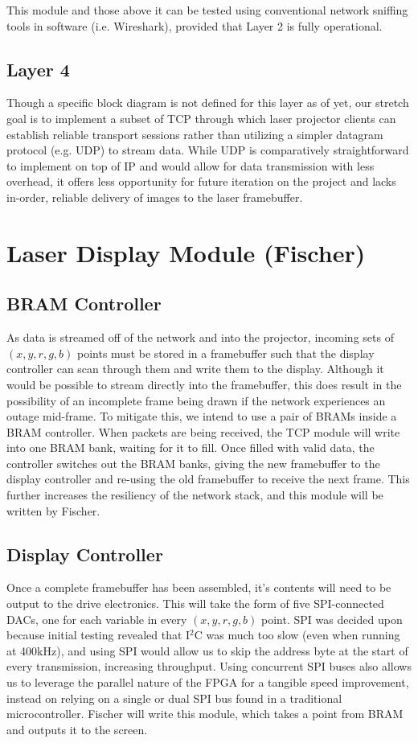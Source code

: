 \documentclass[11pt]{article}
\begin{document}
\noindent This module and those above it can be tested using conventional network sniffing tools in software (i.e. Wireshark), provided that Layer 2 is fully operational.

\subsection{Layer 4}
Though a specific block diagram is not defined for this layer as of yet, our stretch goal is to implement a subset of TCP through which laser projector clients can establish reliable transport sessions rather than utilizing a simpler datagram protocol (e.g. UDP) to stream data. While UDP is comparatively straightforward to implement on top of IP and would allow for data transmission with less overhead, it offers less opportunity for future iteration on the project and lacks in-order, reliable delivery of images to the laser framebuffer.

\section{Laser Display Module (Fischer)}
\subsection{BRAM Controller}
\noindent As data is streamed off of the network and into the projector, incoming sets of $(x, y, r, g, b)$ points must be stored in a framebuffer such that the display controller can scan through them and write them to the display. Although it would be possible to stream directly into the framebuffer, this does result in the possibility of an incomplete frame being drawn if the network experiences an outage mid-frame. To mitigate this, we intend to use a pair of BRAMs inside a BRAM controller. When packets are being received, the TCP module will write into one BRAM bank, waiting for it to fill. Once filled with valid data, the controller switches out the BRAM banks, giving the new framebuffer to the display controller and re-using the old framebuffer to receive the next frame. This further increases the resiliency of the network stack, and this module will be written by Fischer.

\subsection {Display Controller}
\noindent Once a complete framebuffer has been assembled, it's contents will need to be output to the drive electronics. This will take the form of five SPI-connected DACs, one for each variable in every $(x,y,r,g,b)$ point. SPI was decided upon because initial testing revealed that I$^2$C was much too slow (even when running at 400kHz), and using SPI would allow us to skip the address byte at the start of every transmission, increasing throughput. Using concurrent SPI buses also allows us to leverage the parallel nature of the FPGA for a tangible speed improvement, instead on relying on a single or dual SPI bus found in a traditional microcontroller. Fischer will write this module, which takes a point from BRAM and outputs it to the screen.
\end{document}
